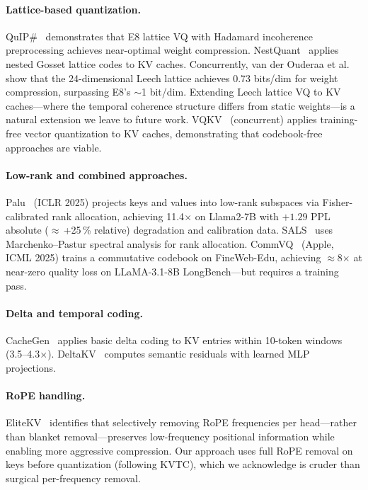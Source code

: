 \documentclass{article}
\begin{document}
\paragraph{Lattice-based quantization.}
QuIP\#~\cite{quipsharp2024} demonstrates that E8 lattice VQ with Hadamard incoherence
preprocessing achieves near-optimal weight compression. NestQuant~\cite{nestquant2025}
applies nested Gosset lattice codes to KV caches. Concurrently, van der Ouderaa
et al.~\cite{llvq2026} show that the 24-dimensional Leech lattice achieves 0.73
bits/dim for weight compression, surpassing E8's $\sim$1 bit/dim. Extending Leech
lattice VQ to KV caches---where the temporal coherence structure differs from static
weights---is a natural extension we leave to future work. VQKV~\cite{vqkv2026}
(concurrent) applies training-free vector quantization to KV caches,
demonstrating that codebook-free approaches are viable.

\paragraph{Low-rank and combined approaches.}
Palu~\cite{palu2025} (ICLR 2025) projects keys and values into low-rank subspaces
via Fisher-calibrated rank allocation, achieving 11.4$\times$ on Llama2-7B with
$+1.29$ PPL absolute ($\approx$\,+25\,\% relative) degradation and calibration data.
SALS~\cite{sals2025} uses Marchenko--Pastur spectral analysis for rank allocation.
CommVQ~\cite{commvq2025} (Apple, ICML 2025) trains a commutative codebook on
FineWeb-Edu, achieving $\approx$8$\times$ at near-zero quality loss on LLaMA-3.1-8B
LongBench---but requires a training pass.

\paragraph{Delta and temporal coding.}
CacheGen~\cite{cachegen2024} applies basic delta coding to KV entries within
10-token windows (3.5--4.3$\times$). DeltaKV~\cite{deltakv2026} computes semantic
residuals with learned MLP projections.

\paragraph{RoPE handling.}
EliteKV~\cite{elitekv2025} identifies that selectively removing RoPE frequencies
per head---rather than blanket removal---preserves low-frequency positional
information while enabling more aggressive compression. Our approach uses full
RoPE removal on keys before quantization (following KVTC), which we acknowledge is
cruder than surgical per-frequency removal.
\end{document}
